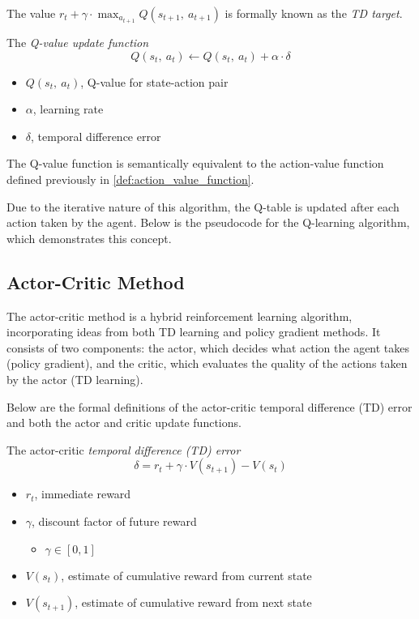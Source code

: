 The value $r_t+\gamma\cdot\max_{a_{t+1}} Q(s_{t+1},~a_{t+1})$ is formally known
as the \textit{TD target}.

\begin{definition} \label{def:q_value_update}
  The \textit{Q-value update function}
  $$Q(s_{t},~a_{t})\leftarrow Q(s_{t},~a_{t})+\alpha\cdot\delta$$
  \begin{itemize}[label={}]
    \item $Q(s_t,~a_t)$, Q-value for state-action pair
    \item $\alpha$, learning rate
    \item $\delta$, temporal difference error
  \end{itemize}
\end{definition}

The Q-value function is semantically equivalent to the action-value function
defined previously in \autoref{def:action_value_function}.

Due to the iterative nature of this algorithm, the Q-table is updated after
each action taken by the agent. Below is the pseudocode for the Q-learning
algorithm, which demonstrates this concept.



\subsection{Actor-Critic Method} \label{sec:actor_critic_method_background}
The actor-critic method is a hybrid reinforcement learning algorithm,
incorporating ideas from both TD learning and policy gradient methods. It
consists of two components: the actor, which decides what action the agent
takes (policy gradient), and the critic, which evaluates the quality of the
actions taken by the actor (TD learning).

Below are the formal definitions of the actor-critic temporal difference (TD)
error and both the actor and critic update functions.

\begin{definition} \label{def:td_error_actor_critic}
  The actor-critic \textit{temporal difference (TD) error}
  $$\delta = r_t+\gamma\cdot V(s_{t+1}) - V(s_t)$$
  \begin{itemize}[label={}]
    \item $r_t$, immediate reward
    \item $\gamma$, discount factor of future reward
          \begin{itemize}[label={}]
            \item $\gamma\in[0,1]$
          \end{itemize}
    \item $V(s_t)$, estimate of cumulative reward from current state
    \item $V(s_{t+1})$, estimate of cumulative reward from next state
  \end{itemize}
\end{definition}

